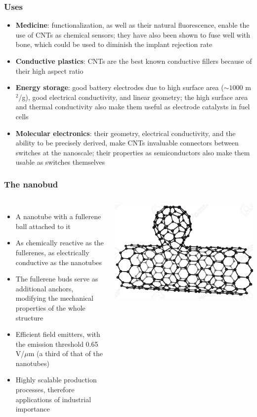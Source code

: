 \documentclass{beamer}
\begin{document}
\begin{frame}
	\frametitle{Uses}
	\begin{itemize}
	\item<1-> \textbf{Medicine}: functionalization, as well as their natural fluorescence, enable the use of CNTs as chemical sensors; they have also been shown to fuse well with bone, which could be used to diminish the implant rejection rate
	\item<2-> \textbf{Conductive plastics}: CNTs are the best known conductive fillers because of their high aspect ratio
	\item<3-> \textbf{Energy storage}: good battery electrodes due to high surface area ($\sim 1000$ m$^2$/g), good electrical conductivity, and linear geometry; the high surface area and thermal conductivity also make them useful as electrode catalysts in fuel cells
	\item<4-> \textbf{Molecular electronics}: their geometry, electrical conductivity, and the ability to be precisely derived, make CNTs invaluable connectors between switches at the nanoscale; their properties as semiconductors also make them usable as switches themselves
	\end{itemize}
\end{frame}

\begin{frame}
	\frametitle{The nanobud}
	\begin{columns}
		\begin{itemize}
			\item A nanotube with a fullerene ball attached to it
			\item As chemically reactive as the fullerenes, as electrically conductive as the nanotubes
			\item The fullerene buds serve as additional anchors, modifying the mechanical properties of the whole structure
			\item Efficient field emitters, with the emission threshold 0.65 V/$\mu$m (a third of that of the nanotubes)
			\item Highly scalable production processes, therefore applications of industrial importance
		\end{itemize}
			\includegraphics[scale=.15]{Nanobud}
	\end{columns}
\end{frame}
\end{document}
